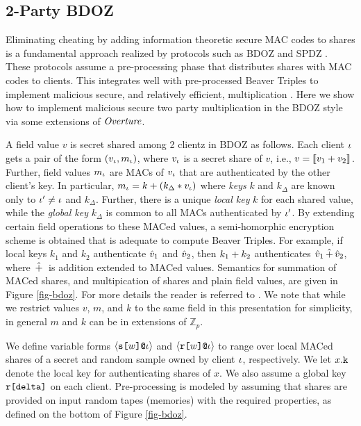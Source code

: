 \subsection{2-Party BDOZ}



Eliminating cheating by adding information theoretic secure MAC codes
to shares is a fundamental approach realized by protocols such as BDOZ
\cite{XXX} and SPDZ \cite{XXX}.  These protocols assume a
pre-processing phase that distributes shares with MAC codes to
clients.  This integrates well with pre-processed Beaver Triples to
implement malicious secure, and relatively efficient, multiplication
\cite{XXX}.  Here we show how to implement malicious secure two party
multiplication in the BDOZ style via some extensions of $\mathit{Overture}$.

A field value $v$ is secret shared among 2 clientz in BDOZ as follows.
Each client $\iota$ gets a pair of the form $(v_\iota,m_\iota)$, where
$v_\iota$ is a secret share of $v$, i.e., $v = \llbracket v_1 + v_2 \rrbracket_{}$.
Further, field values $m_\iota$ are MACs of $v_\iota$ that are authenticated
by the other client's key. In particular, $m_\iota = k + (k_\Delta *
v_\iota)$ where \emph{keys} $k$ and $k_\Delta$ are known only to $\iota'
\ne \iota$ and $k_\Delta$. Further, there is a unique \emph{local key}
$k$ for each shared value, while the \emph{global key} $k_\Delta$ is
common to all MACs authenticated by $\iota'$. By extending certain
field operations to these MACed values, a semi-homorphic encryption
scheme is obtained that is adequate to compute Beaver Triples. For
example, if local keys $k_1$ and $k_2$ authenticate $\hat{v}_1$ and
$\hat{v}_2$, then $k_1 + k_2$ authenticates $\hat{v}_1 \,\hat{+}\,
\hat{v}_2$, where $\,\hat{+}\,$ is addition extended to MACed
values. Semantics for summation of MACed shares, and multipication of
shares and plain field values, are given in Figure \ref{fig-bdoz}.
For more details the reader is referred to \cite{XXX}. We note
that while we restrict values $v$, $m$, and $k$ to the same
field in this presentation for simplicity, in general $m$ and
$k$ can be in extensions of $\mathbb{Z}_p$. 

We define variable forms $\langle \texttt{s[}w\texttt{]} \texttt{@}\iota \rangle$ and
$\langle \texttt{r[}w\texttt{]} \texttt{@}\iota \rangle$ to range over local MACed shares of a secret
and random sample owned by client $\iota$, respectively. We let
$x.\texttt{k}_{}$ denote the local key for authenticating shares of $x$.
We also assume a global key $\texttt{r[}\texttt{delta}\texttt{]}$ on each client.
Pre-processing is modeled by assuming that shares are provided on
input random tapes (memories) with the required properties, as defined
on the bottom of Figure \ref{fig-bdoz}.

